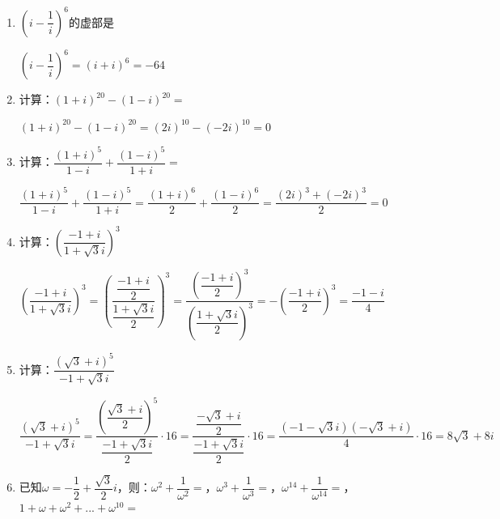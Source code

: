 \begin{enumerate}
\begin{enumerate}
    \item $\left(i - \dfrac{1}{i}\right)^6$的虚部是
    \begin{jieda}
        $\left(i - \dfrac{1}{i}\right)^6 = (i+i)^6 = -64$
    \end{jieda}
    \item 计算：$(1+i)^{20} - (1-i)^{20} = $
    \begin{jieda}
        $(1+i)^{20} - (1-i)^{20} = (2i)^{10} - (-2i)^{10} = 0$
    \end{jieda}
    \item 计算：$\dfrac{(1+i)^5}{1-i} + \dfrac{(1-i)^5}{1+i} = $
    \begin{jieda}
        $\dfrac{(1+i)^5}{1-i} + \dfrac{(1-i)^5}{1+i} = \dfrac{(1+i)^6}{2} + \dfrac{(1-i)^6}{2} = \dfrac{(2i)^3 + (-2i)^3}{2} = 0$
    \end{jieda}
    \item 计算：$\left ( \dfrac{-1+i}{1+\sqrt{3}i}\right)^3$
    \begin{jieda}
        $\left ( \dfrac{-1+i}{1+\sqrt{3}i}\right)^3 = \left ( \dfrac{\dfrac{-1+i}{2}}{\dfrac{1+\sqrt{3}i}{2}}\right)^3 = \dfrac{\left ( \dfrac{-1+i}{2}\right)^3}{\left ( \dfrac{1+\sqrt{3}i}{2}\right)^3} = -\left ( \dfrac{-1+i}{2}\right)^3 = \dfrac{-1-i}{4}$
    \end{jieda}
    \item 计算：$\dfrac{(\sqrt{3}+i)^5}{-1+\sqrt{3}i}$
    \begin{jieda}
        $\dfrac{(\sqrt{3}+i)^5}{-1+\sqrt{3}i} = \dfrac{\left ( \dfrac{\sqrt{3}+i}{2}\right )^5}{\dfrac{-1+\sqrt{3}i}{2}} \cdot 16 = \dfrac{\dfrac{-\sqrt{3}+i}{2}}{\dfrac{-1+\sqrt{3}i}{2}} \cdot 16 = \dfrac{(-1-\sqrt{3}i)(-\sqrt{3}+i)}{4} \cdot 16 = 8\sqrt{3}+8i$
    \end{jieda}
    \item 已知$\omega = -\dfrac{1}{2} + \dfrac{\sqrt{3}}{2}i$，则：$\omega^2+\dfrac{1}{\omega^2} = $，$\omega^3+\dfrac{1}{\omega^3} = $，$\omega^{14}+\dfrac{1}{\omega^{14}} = $，
    $1 + \omega + \omega^2 + ... + \omega^{10} = $
\end{enumerate}
\end{enumerate}
